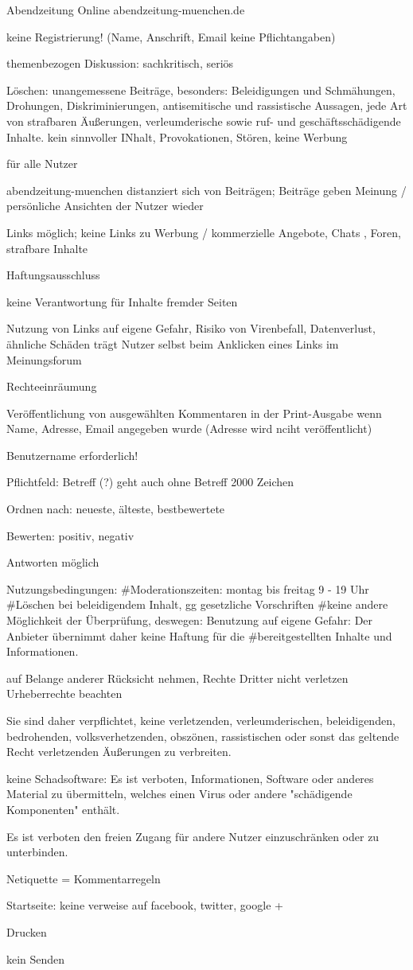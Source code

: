 Abendzeitung Online
abendzeitung-muenchen.de

keine Registrierung! (Name, Anschrift, Email keine Pflichtangaben)

themenbezogen
Diskussion: sachkritisch, seriös

Löschen: unangemessene Beiträge, besonders: Beleidigungen und Schmähungen, Drohungen, Diskriminierungen, antisemitische und rassistische Aussagen, jede Art von strafbaren Äußerungen, verleumderische sowie ruf- und geschäftsschädigende Inhalte.
kein sinnvoller INhalt, Provokationen, Stören, keine Werbung

für alle Nutzer

abendzeitung-muenchen distanziert sich von Beiträgen; Beiträge geben Meinung / persönliche Ansichten der Nutzer wieder

Links möglich; keine Links zu Werbung / kommerzielle Angebote, Chats , Foren, strafbare Inhalte

Haftungsausschluss

keine Verantwortung für Inhalte fremder Seiten

Nutzung von Links auf eigene Gefahr, Risiko von Virenbefall, Datenverlust, ähnliche Schäden trägt Nutzer selbst beim Anklicken eines Links im Meinungsforum

Rechteeinräumung

Veröffentlichung von ausgewählten Kommentaren in der Print-Ausgabe wenn Name, Adresse, Email angegeben wurde (Adresse wird nciht veröffentlicht)

Benutzername erforderlich!

Pflichtfeld: Betreff (?) geht auch ohne Betreff
2000 Zeichen

Ordnen nach: neueste, älteste, bestbewertete

Bewerten: positiv, negativ

Antworten möglich

Nutzungsbedingungen: 
#Moderationszeiten: montag bis freitag 9 - 19 Uhr
#Löschen bei beleidigendem Inhalt, gg gesetzliche Vorschriften
#keine andere Möglichkeit der Überprüfung, deswegen: Benutzung auf eigene Gefahr: Der Anbieter übernimmt daher keine Haftung für die #bereitgestellten Inhalte und Informationen.

auf Belange anderer Rücksicht nehmen, Rechte Dritter nicht verletzen
Urheberrechte beachten

Sie sind daher verpflichtet, keine verletzenden, verleumderischen, beleidigenden, bedrohenden, volksverhetzenden, obszönen, rassistischen oder sonst das geltende Recht verletzenden Äußerungen zu verbreiten.

keine Schadsoftware:  Es ist verboten, Informationen, Software oder anderes Material zu übermitteln, welches einen Virus oder andere "schädigende Komponenten" enthält. 
  
  Es ist verboten den freien Zugang für andere Nutzer einzuschränken oder zu unterbinden.
  
  Netiquette = Kommentarregeln
  
  Startseite: keine verweise auf facebook, twitter, google +
  
  Drucken
  
  kein Senden